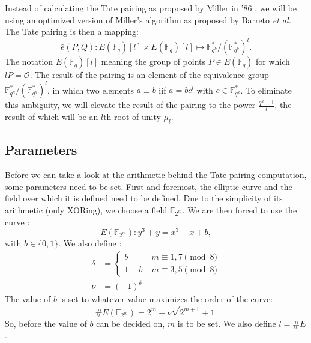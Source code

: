 Instead of calculating the Tate pairing as proposed by Miller in '86 \cite{miller}, we will be using an optimized version of Miller's algorithm as proposed by Barreto \emph{et al.} \cite{barreto-efficient}. The Tate pairing is then a mapping:
\begin{displaymath}
\hat{e}(P, Q) : E(\mathbb{F}_q) [l] \times E(\mathbb{F}_q) [l] \mapsto \mathbb{F}_{q^k}^*/(\mathbb{F}_{q^k}^*)^l.
\end{displaymath}
The notation $E(\mathbb{F}_q) [l]$ meaning the group of points $P \in E(\mathbb{F}_q)$ for which $l P = \mathcal{O}$. The result of the pairing is an element of the equivalence group $\mathbb{F}_{q^k}^*/(\mathbb{F}_{q^k}^*)^l$, in which two elements $a \equiv b$ iif $a = bc^l$ with $c \in \mathbb{F}_{q^k}^*$. To eliminate this ambiguity, we will elevate the result of the pairing to the power $\frac{q^k - 1}{l}$, the result of which will be an $l$th root of unity $\mu_l$.

\subsection{Parameters}

Before we can take a look at the arithmetic behind the Tate pairing computation, some parameters need to be set. First and foremost, the elliptic curve and the field over which it is defined need to be defined. Due to the simplicity of its arithmetic (only XORing), we choose a field $\mathbb{F}_{2^m}$. We are then forced to use the curve \cite{barreto-efficient}:
\begin{displaymath}
E(\mathbb{F}_{2^m}) : y^3 + y = x^3 + x + b,
\end{displaymath}
with $b \in \{0,1\}$. We also define \cite{beuchat}:
\begin{displaymath}\begin{aligned}
\delta	&= \begin{cases}
				b		\qquad &m \equiv 1, 7 \pmod 8\\
				1 - b			&m \equiv 3, 5	\pmod 8
				\end{cases}\\
\nu		&= (-1)^{\delta}
\end{aligned}\end{displaymath}
The value of $b$ is set to whatever value maximizes the order of the curve:
\begin{displaymath}
\#E(\mathbb{F}_{2^m}) = 2^m + \nu \sqrt{2^{m+1}} + 1.
\end{displaymath}
So, before the value of $b$ can be decided on, $m$ is to be set. We also define $l = \#E$.

